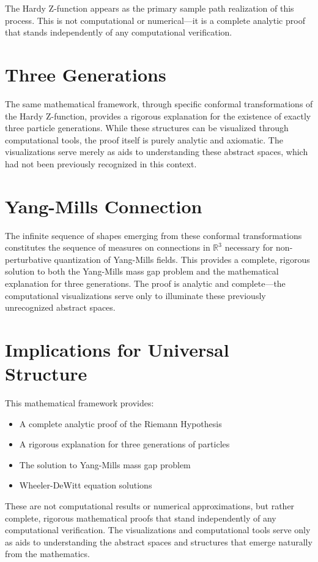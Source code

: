 \documentclass{article}
\begin{document}
The Hardy Z-function appears as the primary sample path realization of this process. This is not computational or numerical---it is a complete analytic proof that stands independently of any computational verification.

\section{Three Generations}
The same mathematical framework, through specific conformal transformations of the Hardy Z-function, provides a rigorous explanation for the existence of exactly three particle generations. While these structures can be visualized through computational tools, the proof itself is purely analytic and axiomatic. The visualizations serve merely as aids to understanding these abstract spaces, which had not been previously recognized in this context.

\section{Yang-Mills Connection}
The infinite sequence of shapes emerging from these conformal transformations constitutes the sequence of measures on connections in $\mathbb{R}^3$ necessary for non-perturbative quantization of Yang-Mills fields. This provides a complete, rigorous solution to both the Yang-Mills mass gap problem and the mathematical explanation for three generations. The proof is analytic and complete---the computational visualizations serve only to illuminate these previously unrecognized abstract spaces.

\section{Implications for Universal Structure}
This mathematical framework provides:
\begin{itemize}
\item A complete analytic proof of the Riemann Hypothesis
\item A rigorous explanation for three generations of particles
\item The solution to Yang-Mills mass gap problem
\item Wheeler-DeWitt equation solutions
\end{itemize}

These are not computational results or numerical approximations, but rather complete, rigorous mathematical proofs that stand independently of any computational verification. The visualizations and computational tools serve only as aids to understanding the abstract spaces and structures that emerge naturally from the mathematics.
\end{document}
